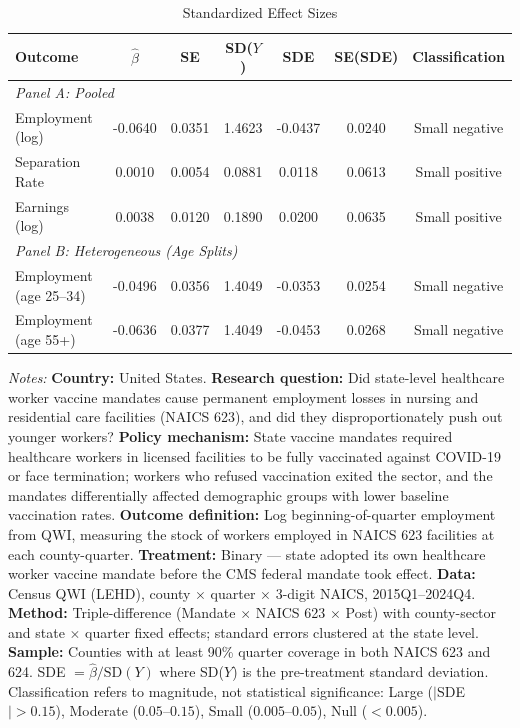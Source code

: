 \begin{table}[htbp]
\centering
\caption{Standardized Effect Sizes}
\label{tab:sde}
\begin{threeparttable}
\small
\begin{tabular}{@{}lcccccc@{}}
\hline\hline
Outcome & $\hat{\beta}$ & SE & SD($Y$) & SDE & SE(SDE) & Classification \\
\hline
\multicolumn{7}{l}{\textit{Panel A: Pooled}} \\
Employment (log) & -0.0640 & 0.0351 & 1.4623 & -0.0437 & 0.0240 & Small negative \\
Separation Rate & 0.0010 & 0.0054 & 0.0881 & 0.0118 & 0.0613 & Small positive \\
Earnings (log) & 0.0038 & 0.0120 & 0.1890 & 0.0200 & 0.0635 & Small positive \\
\hline
\multicolumn{7}{l}{\textit{Panel B: Heterogeneous (Age Splits)}} \\
Employment (age 25--34) & -0.0496 & 0.0356 & 1.4049 & -0.0353 & 0.0254 & Small negative \\
Employment (age 55+) & -0.0636 & 0.0377 & 1.4049 & -0.0453 & 0.0268 & Small negative \\
\hline\hline
\end{tabular}
\begin{tablenotes}[flushleft]
\small
\item \textit{Notes:} \textbf{Country:} United States. \textbf{Research question:} Did state-level healthcare worker vaccine mandates cause permanent employment losses in nursing and residential care facilities (NAICS 623), and did they disproportionately push out younger workers? \textbf{Policy mechanism:} State vaccine mandates required healthcare workers in licensed facilities to be fully vaccinated against COVID-19 or face termination; workers who refused vaccination exited the sector, and the mandates differentially affected demographic groups with lower baseline vaccination rates. \textbf{Outcome definition:} Log beginning-of-quarter employment from QWI, measuring the stock of workers employed in NAICS 623 facilities at each county-quarter. \textbf{Treatment:} Binary --- state adopted its own healthcare worker vaccine mandate before the CMS federal mandate took effect. \textbf{Data:} Census QWI (LEHD), county $\times$ quarter $\times$ 3-digit NAICS, 2015Q1--2024Q4. \textbf{Method:} Triple-difference (Mandate $\times$ NAICS 623 $\times$ Post) with county-sector and state $\times$ quarter fixed effects; standard errors clustered at the state level. \textbf{Sample:} Counties with at least 90\% quarter coverage in both NAICS 623 and 624. SDE $= \hat{\beta} / \text{SD}(Y)$ where SD($Y$) is the pre-treatment standard deviation. Classification refers to magnitude, not statistical significance: Large ($|$SDE$| > 0.15$), Moderate ($0.05$--$0.15$), Small ($0.005$--$0.05$), Null ($< 0.005$). 
\end{tablenotes}
\end{threeparttable}
\end{table}
